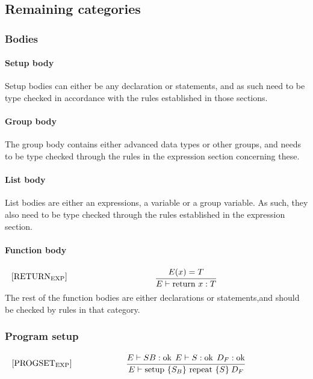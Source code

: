 \subsection{Remaining categories}
\subsubsection{Bodies}
\paragraph{Setup body}
Setup bodies can either be any declaration or statements, and as such need to be type checked in accordance with the rules established in those sections.
\paragraph{Group body}
The group body contains either advanced data types or other groups, and needs to be type checked through the rules in the expression section concerning these.
\paragraph{List body}
List bodies are either an expressions, a variable or a group variable. As such, they also need to be type checked through the rules established in the expression section.
\paragraph{Function body}
\begin{equation}
\begin{minipage}{.2\linewidth}
$[\text{RETURN}_\text{EXP}]$
\end{minipage}
\begin{minipage}{.8\linewidth}
\centering
 $\cfrac {E(x) = T}{E \vdash \text{return } x : T}$
\end{minipage}
\end{equation}
The rest of the function bodies are either declarations or statements,and should be checked by rules in that category.

\subsubsection{Program setup}
\begin{equation}
\begin{minipage}{.2\linewidth}
$[\text{PROGSET}_\text{EXP}]$
\end{minipage}
\begin{minipage}{.8\linewidth}
\centering
 $\cfrac {E \vdash SB : \text{ok} \: \: E \vdash S : \text{ok} \: \: D_F : \text{ok}}{E \vdash \text{setup } \{ S_B \} \text{ repeat } \{ S \} \: D_F}$
\end{minipage}
\end{equation}


